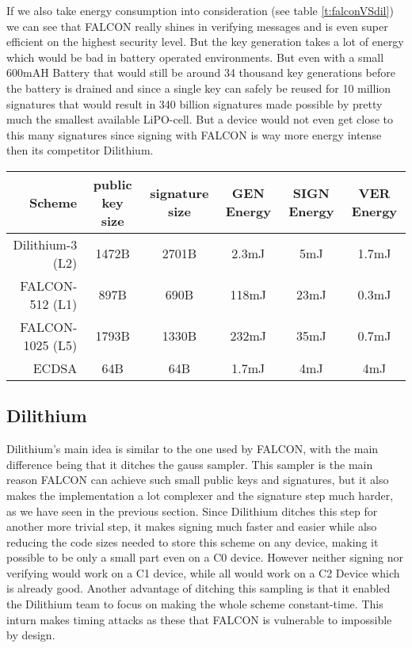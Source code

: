 \documentclass[conference]{IEEEtran}
\newcommand{\comment}[1]{}
\begin{document}
If we also take energy consumption into consideration (see table \ref{t:falconVSdil}) we can see that FALCON really shines in verifying messages and is even super efficient on the highest security level. But the key generation takes a lot of energy which would be bad in battery operated environments. But even with a small 600mAH Battery that would still be around 34 thousand key generations before the battery is drained and since a single key can safely be reused for 10 million signatures that would result in 340 billion signatures made possible by pretty much the smallest available LiPO-cell. But a device would not even get close to this many signatures since signing with FALCON is way more energy intense then its competitor Dilithium.

\begin{table*}[]
    \caption{Direct comparison of FALCON and Dilithium on M4. \cite{Energy_comp}}
    \label{t:falconVSdil}
    \centering\begin{tabular}{ | r | c c c c c |}
        \hline
        Scheme & public key size & signature size & GEN Energy & SIGN Energy & VER Energy \\
        \hline
        Dilithium-3 (L2)    & 1472B & 2701B & 2.3mJ & 5mJ   & 1.7mJ \\
        FALCON-512 (L1)     & 897B  & 690B  & 118mJ & 23mJ  & 0.3mJ \\
        FALCON-1025 (L5)    & 1793B & 1330B & 232mJ & 35mJ  & 0.7mJ \\
        \hline
        ECDSA               & 64B   & 64B   & 1.7mJ & 4mJ   & 4mJ \\
        \hline
    \end{tabular}
\end{table*}

\subsection{Dilithium}
\comment{ %
FALCON reaches small pubk and sig since usage of gaussian sampling, - also makes signing hard, dilithium doesnt

runs in constant time - no timing attacks possible \cite{Dilithium}

} %

Dilithium's main idea is similar to the one used by FALCON, with the main difference being that it ditches the gauss sampler.
This sampler is the main reason FALCON can achieve such small public keys and signatures, but it also makes the implementation a lot complexer and the signature step much harder, as we have seen in the previous section. 
Since Dilithium ditches this step for another more trivial step, it makes signing much faster and easier while also reducing the code sizes needed to store this scheme on any device, making it possible to be only a small part even on a C0 device. However neither signing nor verifying would work on a C1 device, while all would work on a C2 Device which is already good.
Another advantage of ditching this sampling is that it enabled the Dilithium team to focus on making the whole scheme constant-time. This inturn makes timing attacks as these that FALCON is vulnerable to impossible by design. \cite{Dilithium}
\end{document}

